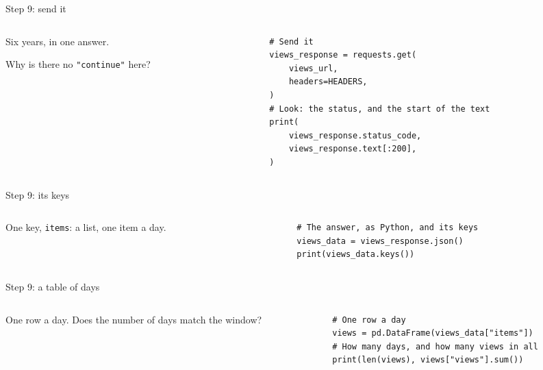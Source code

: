 \documentclass[9pt,aspectratio=169]{beamer}
\begin{document}
\begin{frame}[fragile]{Step 9: send it}
    \begin{columns}[T]
        \begin{column}{0.37\textwidth}
            Six years, in one answer.

            \medskip
            Why is there no \texttt{"continue"} here?
        \end{column}
        \begin{column}{0.6\textwidth}
\begin{lstlisting}
# Send it
views_response = requests.get(
    views_url,
    headers=HEADERS,
)
# Look: the status, and the start of the text
print(
    views_response.status_code,
    views_response.text[:200],
)
\end{lstlisting}
        \end{column}
    \end{columns}
\end{frame}

\begin{frame}[fragile]{Step 9: its keys}
    \begin{columns}[T]
        \begin{column}{0.37\textwidth}
            One key, \texttt{items}: a list, one item a day.
        \end{column}
        \begin{column}{0.6\textwidth}
\begin{lstlisting}
# The answer, as Python, and its keys
views_data = views_response.json()
print(views_data.keys())
\end{lstlisting}
        \end{column}
    \end{columns}
\end{frame}

\begin{frame}[fragile]{Step 9: a table of days}
    \begin{columns}[T]
        \begin{column}{0.37\textwidth}
            One row a day. Does the number of days match the window?
        \end{column}
        \begin{column}{0.6\textwidth}
\begin{lstlisting}
# One row a day
views = pd.DataFrame(views_data["items"])
# How many days, and how many views in all
print(len(views), views["views"].sum())
\end{lstlisting}
        \end{column}
    \end{columns}
\end{frame}
\end{document}
